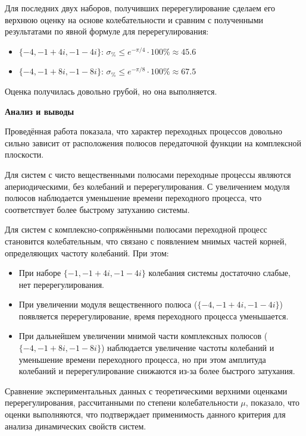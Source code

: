 Для последних двух наборов, получивших перерегулирование сделаем его верхнюю оценку на основе колебательности и сравним с полученными результатами по явной формуле для перерегулирования:


\begin{itemize}
\setlength{\itemsep}{-1ex}
   \item{\begin{flushleft} $\lbrace -4,-1+4i,-1-4i\rbrace$: $\sigma_{\%} \le e^{-\pi /4} \cdot 100\%\approx 45.6$ \end{flushleft}}
   \item{\begin{flushleft} $\lbrace -4,-1+8i,-1-8i\rbrace$: $\sigma_{\%} \le e^{-\pi /8} \cdot 100\%\approx 67.5$ \end{flushleft}}
\end{itemize}

Оценка получилась довольно грубой, но она выполняется.


\textbf{Анализ и выводы}

Проведённая работа показала, что характер переходных процессов довольно сильно зависит от расположения полюсов передаточной функции на комплексной плоскости.


Для систем с чисто вещественными полюсами переходные процессы являются апериодическими, без колебаний и перерегулирования. С увеличением модуля полюсов наблюдается уменьшение времени переходного процесса, что соответствует более быстрому затуханию системы.


Для систем с комплексно-сопряжёнными полюсами переходной процесс становится колебательным, что связано с появлением мнимых частей корней, определяющих частоту колебаний. При этом:
\begin{itemize}
   \item При наборе $\lbrace -1,-1+4i,-1-4i\rbrace$ колебания системы достаточно слабые, нет перерегулирования.
   \item При увеличении модуля вещественного полюса ($\lbrace -4,-1+4i,-1-4i\rbrace$) появляется перерегулирование, время переходного процесса уменьшается.
   \item При дальнейшем увеличении мнимой части комплексных полюсов ($\lbrace -4,-1+8i,-1-8i\rbrace$) наблюдается увеличение частоты колебаний и уменьшение времени переходного процесса, но при этом амплитуда колебаний и перерегулирование снижаются из-за более быстрого затухания.
\end{itemize}


Сравнение экспериментальных данных с теоретическими верхними оценками перерегулирования, рассчитанными по степени колебательности $\mu$, показало, что оценки выполняются, что подтверждает применимость данного критерия для анализа динамических свойств систем.

